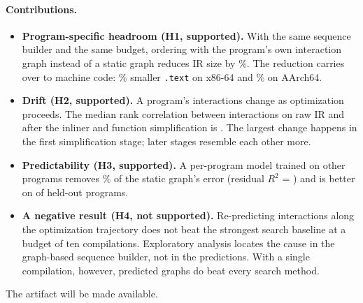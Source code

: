 \paragraph{Contributions.}
\begin{itemize}
\item \textbf{Program-specific headroom (H1, supported).} With the same sequence builder and the same budget, ordering with
the program's own interaction graph instead of a static graph reduces IR size by \HOnePct\%. The reduction
carries over to machine code: \MSizeXPct\% smaller \texttt{.text} on x86-64 and \MSizeAPct\% on AArch64.
\item \textbf{Drift (H2, supported).} A program's interactions change as optimization proceeds. The
median rank correlation between interactions on raw IR and after the inliner and function
simplification is \HTwoRho. The largest change happens in the first simplification stage;
later stages resemble each other more.
\item \textbf{Predictability (H3, supported).} A per-program model trained on other programs removes
\HThreeGap\% of the static graph's error (residual $R^2$ = \HThreeRsq) and is better on
\HThreeBetter{} of \HThreePrograms{} held-out programs.
\item \textbf{A negative result (H4, not supported).} Re-predicting interactions along the
optimization trajectory does not beat the strongest search baseline at a budget of ten compilations.
Exploratory analysis locates the cause in the graph-based sequence builder, not in the predictions.
With a single compilation, however, predicted graphs do beat every search method.
\end{itemize}
The artifact will be made available.
